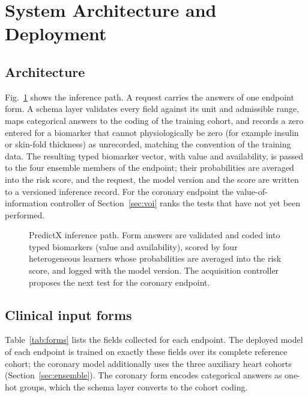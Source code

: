 \section{System Architecture and Deployment}\label{sec:system}
\subsection{Architecture}
Fig.~\ref{fig:system} shows the inference path. A request carries the answers of one endpoint form. A schema layer validates every field against its unit and admissible range, maps categorical answers to the coding of the training cohort, and records a zero entered for a biomarker that cannot physiologically be zero (for example insulin or skin-fold thickness) as unrecorded, matching the convention of the training data. The resulting typed biomarker vector, with value and availability, is passed to the four ensemble members of the endpoint; their probabilities are averaged into the risk score, and the request, the model version and the score are written to a versioned inference record. For the coronary endpoint the value-of-information controller of Section~\ref{sec:voi} ranks the tests that have not yet been performed.

\begin{figure}[!t]
\centering
\resizebox{0.95\textwidth}{!}{}
\caption{PredictX inference path. Form answers are validated and coded into typed biomarkers (value and availability), scored by four heterogeneous learners whose probabilities are averaged into the risk score, and logged with the model version. The acquisition controller proposes the next test for the coronary endpoint.}
\label{fig:system}
\end{figure}

\subsection{Clinical input forms}
Table~\ref{tab:forms} lists the fields collected for each endpoint. The deployed model of each endpoint is trained on exactly these fields over its complete reference cohort; the coronary model additionally uses the three auxiliary heart cohorts (Section~\ref{sec:ensemble}). The coronary form encodes categorical answers as one-hot groups, which the schema layer converts to the cohort coding.

